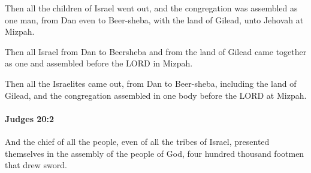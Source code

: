			\begin{versebox}
					\item[BHS] 
					\item[ASV] Then all the children of Israel went out, and the congregation was assembled as one man, from Dan even to Beer-sheba, with the land of Gilead, unto Jehovah at Mizpah.
					\item[NIV] Then all Israel from Dan to Beersheba and from the land of Gilead came together as one and assembled before the LORD in Mizpah.
					\item[NRSV] Then all the Israelites came out, from Dan to Beer-sheba, including the land of Gilead, and the congregation assembled in one body before the LORD at Mizpah.
			\end{versebox}

		\paragraph{Judges 20:2} %
			\label{JUDGES-20-2}

			And the chief of all the people, even of all the tribes of Israel, presented themselves in the assembly of the people of God, four hundred thousand footmen that drew sword.

